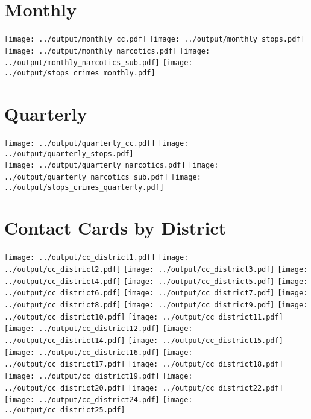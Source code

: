 \documentclass[]{article}
\title{}
\author{}
\begin{document}
\section*{Monthly}
\centering
\texttt{[image: ../output/monthly\_cc.pdf]}
\texttt{[image: ../output/monthly\_stops.pdf]}
\\
\texttt{[image: ../output/monthly\_narcotics.pdf]}
\texttt{[image: ../output/monthly\_narcotics\_sub.pdf]}
\clearpage
\texttt{[image: ../output/stops\_crimes\_monthly.pdf]}
\clearpage

\section{Quarterly}	
\texttt{[image: ../output/quarterly\_cc.pdf]}
\texttt{[image: ../output/quarterly\_stops.pdf]}
\\
\texttt{[image: ../output/quarterly\_narcotics.pdf]}
\texttt{[image: ../output/quarterly\_narcotics\_sub.pdf]}
\clearpage
\texttt{[image: ../output/stops\_crimes\_quarterly.pdf]}
\clearpage

\section{Contact Cards by District}
\texttt{[image: ../output/cc\_district1.pdf]}
\texttt{[image: ../output/cc\_district2.pdf]}
\texttt{[image: ../output/cc\_district3.pdf]}
\texttt{[image: ../output/cc\_district4.pdf]}
\texttt{[image: ../output/cc\_district5.pdf]}
\texttt{[image: ../output/cc\_district6.pdf]}
\texttt{[image: ../output/cc\_district7.pdf]}
\texttt{[image: ../output/cc\_district8.pdf]}
\texttt{[image: ../output/cc\_district9.pdf]}
\texttt{[image: ../output/cc\_district10.pdf]}
\texttt{[image: ../output/cc\_district11.pdf]}
\texttt{[image: ../output/cc\_district12.pdf]}
\texttt{[image: ../output/cc\_district14.pdf]}
\texttt{[image: ../output/cc\_district15.pdf]}
\texttt{[image: ../output/cc\_district16.pdf]}
\texttt{[image: ../output/cc\_district17.pdf]}
\texttt{[image: ../output/cc\_district18.pdf]}
\texttt{[image: ../output/cc\_district19.pdf]}
\texttt{[image: ../output/cc\_district20.pdf]}
\texttt{[image: ../output/cc\_district22.pdf]}
\texttt{[image: ../output/cc\_district24.pdf]}
\texttt{[image: ../output/cc\_district25.pdf]}
\end{document}
